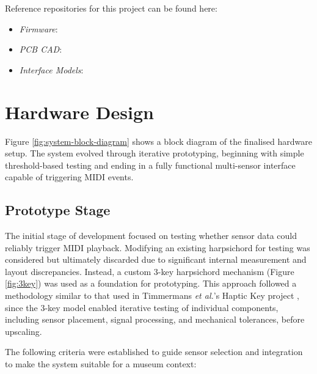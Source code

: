 \begin{anonsuppress}
Reference repositories for this project can be found here:

    \begin{itemize}
        \item 
        \emph{Firmware}: 
        \item 
        \emph{PCB CAD}: 
        \item 
        \emph{Interface Models}: 
    \end{itemize}
\end{anonsuppress}


\section{Hardware Design}\label{hardware-design}





Figure \ref{fig:system-block-diagram} shows a block diagram of the finalised hardware setup. 
The system evolved through iterative prototyping, beginning with simple threshold-based testing and ending in a fully functional multi-sensor interface capable of triggering MIDI events. 



\subsection{Prototype Stage}

The initial stage of development focused on testing whether sensor data could reliably trigger MIDI playback. Modifying an existing harpsichord for testing was considered but ultimately discarded due to significant internal measurement and layout discrepancies. Instead, a custom 3-key harpsichord mechanism (Figure \ref{fig:3key}) was used as a foundation for prototyping. This approach followed a methodology similar to that used in Timmermans \emph{et al.}'s Haptic Key project \cite{Timmermans2020}, since the 3-key model enabled iterative testing of individual components, including sensor placement, signal processing, and mechanical tolerances, before upscaling. 

The following criteria were established to guide sensor selection and integration to make the system suitable for a museum context:

